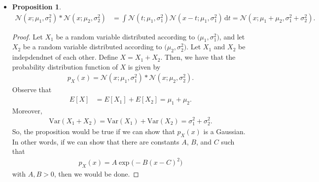 \documentclass[10pt]{article}
\newtheorem{proposition}[lemma]{Proposition}
\newcommand{\dee}{\mathrm{d}}
\newcommand{\Var}{\mathrm{Var}}
\newcommand{\mcal}[1]{\mathcal{#1}}
\begin{document}
\begin{itemize}
  \item \begin{proposition} \label{gaussian-convolution}
    \begin{align*}
    \mcal{N}(x;\mu_1, \sigma_1^2) * \mcal{N}(x;\mu_2, \sigma_2^2)
    &= \int \mcal{N}(t;\mu_1, \sigma_1^2) \mcal{N}(x-t;\mu_1, \sigma_1^2)\, \dee t
    = \mcal{N}(x; \mu_1 + \mu_2, \sigma_1^2 + \sigma_2^2).
    \end{align*}
  \end{proposition}
  \begin{proof}
    Let $X_1$ be a random variable distributed according to $\mcal(\mu_1, \sigma_1^2)$, and let $X_2$ be a random variable distributed according to $\mcal(\mu_2, \sigma_2^2)$. Let $X_1$ and $X_2$ be indepdendnet of each other. Define $X = X_1 + X_2$. Then,
    we have that the probability distribution function of $X$ is given by
    \begin{align*}
      p_X(x) = \mcal{N}(x;\mu_1, \sigma_1^2) * \mcal{N}(x;\mu_2, \sigma_2^2).
    \end{align*}
    Observe that 
    \begin{align*}
      E[X] &= E[X_1] + E[X_2] = \mu_1 + \mu_2.
    \end{align*}
    Moreover,
    \begin{align*}
      \Var(X_1 + X_2) = \Var(X_1) + \Var(X_2) = \sigma_1^2 + \sigma_2^2.
    \end{align*}
    So, the proposition would be true if we can show that $p_X(x)$ is a Gaussian. In other words, if we can show that there are constants $A$, $B$, and $C$ such that
    \begin{align*}
      p_X(x) = A \exp\big(-B(x - C)^2\big)
    \end{align*}    
    with $A, B > 0$, then we would be done.


\end{proof}
\end{itemize}
\end{document}
